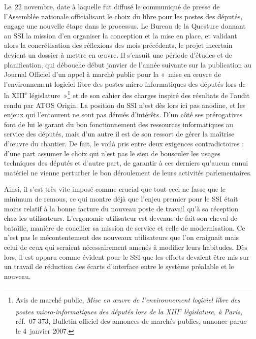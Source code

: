 \documentclass{FramateX}
\begin{document}
\begin{refsection}
Le~22 novembre, date à laquelle fut diffusé le communiqué de presse de
l'Assemblée nationale officialisant le choix du libre pour les postes
des députés, engage une nouvelle étape dans le processus. Le Bureau de
la Questure donnant au SSI la mission d'en organiser la conception et
la mise en place, et validant alors la concrétisation des réflexions
des mois précédents, le projet incertain devient un dossier à mettre en
œuvre. Il s'ensuit une période d'études et de planification, qui
débouche début janvier de l'année suivante sur la publication au
Journal Officiel d'un appel à marché public pour la «~mise en œuvre de
l'environnement logiciel libre des postes micro-informatiques des
députés lors de la XIII\textsuperscript{e} législature~»\footnote{Avis
de marché public, \textit{Mise en œuvre de l'environnement logiciel
libre des postes micro-informatiques des députés lors de la
XIII}\textit{\textsuperscript{e}}\textit{ législature, à Paris},
réf.~07-373, Bulletin officiel des annonces de marchés publics, annonce
parue le 4~janvier 2007.} et de son cahier des charges inspiré des
résultats de l'audit rendu par ATOS Origin. La position du SSI n'est
dès lors ici pas anodine, et les enjeux qui l'entourent ne sont pas
dénués d'intérêts. D'un côté ses prérogatives font de lui le garant du
bon fonctionnement des ressources informatiques au service des députés,
mais d'un autre il est de son ressort de gérer la maîtrise d'œuvre du
chantier. De fait, le voilà pris entre deux exigences contradictoires :
d'une part assumer le choix qui n'est pas le sien de bousculer les
usages techniques des députés et d'autre part, de garantir à ces
derniers qu'aucun ennui matériel ne vienne perturber le bon déroulement
de leurs activités parlementaires. 

Ainsi, il s'est très vite imposé comme crucial que tout ceci ne fasse
que le minimum de remous, ce qui montre déjà que l'enjeu premier pour
le SSI était moins relatif à la bonne facture du nouveau poste de
travail qu'à sa réception chez les utilisateurs. L'ergonomie
utilisateur est devenue de fait son cheval de bataille, manière de
concilier sa mission de service et celle de modernisation. Ce n'est pas
le mécontentement des nouveaux utilisateurs que l'on craignait mais
celui de ceux qui seraient nécessairement amenés à modifier leurs
habitudes. Dès lors, il est apparu comme évident pour le SSI que les
efforts devaient être mis sur un travail de réduction des écarts
d'interface entre le système préalable et le nouveau.


\end{refsection}
\end{document}

